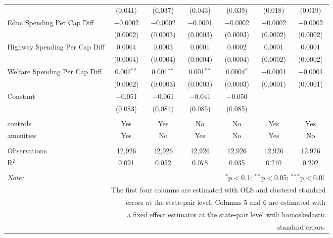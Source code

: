 \begin{table}[!htbp]
\begin{tabular}{@{\extracolsep{5pt}}lcccccc}
  & (0.041) & (0.037) & (0.043) & (0.039) & (0.018) & (0.019) \\ 
  Educ Spending Per Cap Diff & $-$0.0002 & $-$0.0002 & $-$0.0001 & $-$0.0002 & $-$0.0002 & $-$0.0002 \\ 
  & (0.0002) & (0.0003) & (0.0003) & (0.0003) & (0.0002) & (0.0002) \\ 
  Highway Spending Per Cap Diff & 0.0004 & 0.0003 & 0.0001 & 0.0002 & 0.0001 & 0.0001 \\ 
  & (0.0004) & (0.0004) & (0.0004) & (0.0004) & (0.0002) & (0.0002) \\ 
  Welfare Spending Per Cap Diff & 0.001$^{**}$ & 0.001$^{**}$ & 0.001$^{**}$ & 0.0004$^{*}$ & $-$0.0001 & $-$0.0001 \\ 
  & (0.0002) & (0.0003) & (0.0003) & (0.0003) & (0.0001) & (0.0001) \\ 
  Constant & $-$0.051 & $-$0.061 & $-$0.041 & $-$0.050 &  &  \\ 
  & (0.083) & (0.084) & (0.085) & (0.085) &  &  \\ 
 \hline \\[-1.8ex] 
controls & Yes & Yes & No & No & Yes & Yes \\ 
amenities & Yes & No & Yes & No & Yes & No \\ 
\hline \\[-1.8ex] 
Observations & 12,926 & 12,926 & 12,926 & 12,926 & 12,926 & 12,926 \\ 
R$^{2}$ & 0.091 & 0.052 & 0.078 & 0.035 & 0.240 & 0.202 \\ 
\hline 
\hline \\[-1.8ex] 
\textit{Note:}  & \multicolumn{6}{r}{$^{*}$p$<$0.1; $^{**}$p$<$0.05; $^{***}$p$<$0.01} \\ 
 & \multicolumn{6}{r}{The first four columns are estimated with OLS and clustered standard} \\ 
 & \multicolumn{6}{r}{ errors at the state-pair level. Columns 5 and 6 are estimated with} \\ 
 & \multicolumn{6}{r}{a fixed effect estimator at the state-pair level with homoskedastic} \\ 
 & \multicolumn{6}{r}{standard errors.} \\ 
\end{tabular} 
\end{table} 
